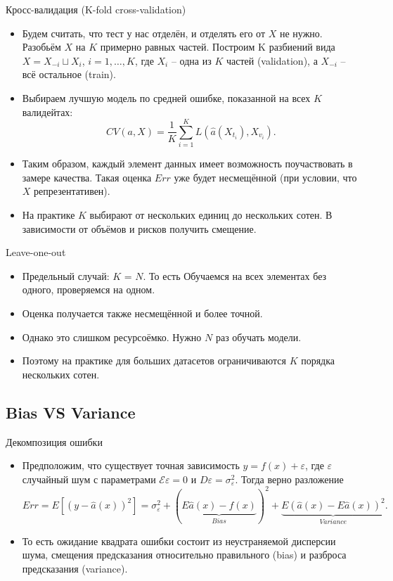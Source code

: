 \documentclass[9pt]{beamer}
\begin{document}
\begin{frame}{Кросс-валидация (K-fold cross-validation)}
\begin{itemize}
    \item Будем считать, что тест у нас отделён, и отделять его от $X$ не нужно. Разобьём $X$ на $K$ примерно равных частей. Построим K разбиений вида $X = X_{-i} \sqcup X_{i}$, $i=1,\ldots, K$, где $X_{i}$ -- одна из $K$ частей (validation), а $X_{-i}$ -- всё остальное (train).
    \item Выбираем лучшую модель по средней ошибке, показанной на всех $K$ валидейтах:
    $$CV(a, X) = \frac{1}{K} \sum_{i=1}^K L(\hat a(X_{t_i}), X_{v_i}).$$
    \item Таким образом, каждый элемент данных имеет возможность поучаствовать в замере качества. Такая оценка $Err$ уже будет несмещённой (при условии, что $X$ репрезентативен).
    \item На практике $K$ выбирают от нескольких единиц до нескольких сотен. В зависимости от объёмов и рисков получить смещение.
\end{itemize}
\end{frame}

\begin{frame}{Leave-one-out}
    \begin{itemize}
        \item Предельный случай: $K$ = $N$. То есть Обучаемся на всех элементах без одного, проверяемся на одном.
        \item Оценка получается также несмещённой и более точной.
        \item Однако это слишком ресурсоёмко. Нужно $N$ раз обучать модели.
        \item Поэтому на практике для больших датасетов ограничиваются $K$ порядка нескольких сотен.
    \end{itemize}
\end{frame}

\subsection{Bias VS Variance}
\begin{frame}{Декомпозиция ошибки}
    \begin{itemize}
        \item Предположим, что существует точная зависимость $y = f(x) +\varepsilon$, где $\varepsilon$ случайный шум с параметрами $\mathcal{E}\varepsilon = 0$ и $D\varepsilon = \sigma^2_\varepsilon$.
        Тогда верно разложение
        $$Err = E[(y - \hat a(x))^2] = \sigma^2_\varepsilon + (\underbrace{E\hat a(x) - f(x)}_{Bias})^2 + \underbrace{E(\hat a(x) - E\hat a(x))^2}_{Variance}.$$
        \item То есть ожидание квадрата ошибки состоит из неустраняемой дисперсии шума, смещения предсказания относительно правильного (bias) и разброса предсказания (variance).
    \end{itemize}
\end{frame}
\end{document}
